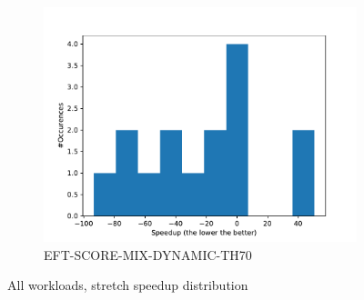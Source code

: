 \documentclass[a4paper]{article}
\begin{document}
\begin{figure}[H]
\begin{subfigure}[b]{0.4\linewidth}\centering\includegraphics[width=1\linewidth]{MBSS/plot/Distribution/Stretch/Stretch_all_workloads_EFT-SCORE-MIX-DYNAMIC-TH70.pdf}\caption{EFT-SCORE-MIX-DYNAMIC-TH70}\end{subfigure}
\caption{All workloads, stretch speedup distribution}\end{figure}
\end{document}
